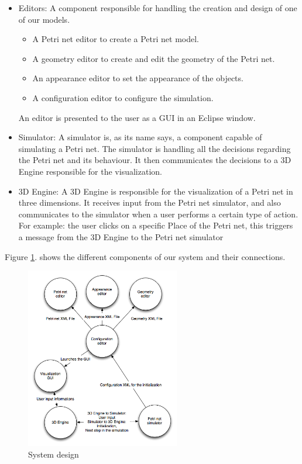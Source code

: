 \begin{itemize}
  \item Editors: A component responsible for handling the creation and design of one of our models. 
	\begin{itemize}
	 \item A Petri net editor to create a Petri net model.
	 \item A geometry editor to create and edit the geometry of the Petri net.
	 \item An appearance editor to set the appearance of the objects.
	 \item A configuration editor to configure the simulation.
	 \end{itemize}
	An editor is presented to the user as a GUI in an Eclipse window.
  \item Simulator: A simulator is, as its name says, a component capable of simulating a Petri net.
	The simulator is handling all the decisions regarding the Petri net and its behaviour. 
	It then communicates the decisions to a 3D Engine responsible for the visualization.
  \item 3D Engine: A 3D Engine is responsible for the visualization of a Petri net in three dimensions.
	It receives input from the Petri net simulator, and also communicates to the simulator when a user performs a certain type of action. \newline
	For example: the user clicks on a specific Place of the Petri net, this triggers a message from the 3D Engine to the Petri net simulator 
\end{itemize}
\newpage
Figure \ref{fig:system_diagram}. shows the different components of our system and their connections.

\begin{figure}[htp]
\begin{center}
  \includegraphics[width=0.6\textwidth]{image/system_design.png}
  \caption{System design}
  \label{fig:system_diagram}
\end{center}
\end{figure}

